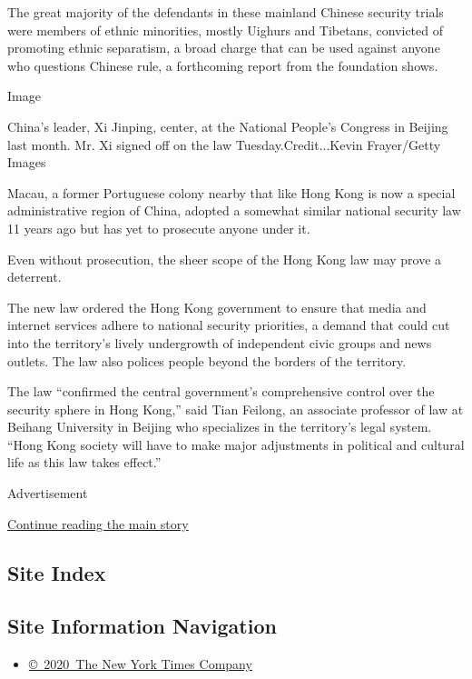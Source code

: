 The great majority of the defendants in these mainland Chinese security
trials were members of ethnic minorities, mostly Uighurs and Tibetans,
convicted of promoting ethnic separatism, a broad charge that can be
used against anyone who questions Chinese rule, a forthcoming report
from the foundation shows.

Image

China's leader, Xi Jinping, center, at the National People's Congress in
Beijing last month. Mr. Xi signed off on the law Tuesday.Credit...Kevin
Frayer/Getty Images

Macau, a former Portuguese colony nearby that like Hong Kong is now a
special administrative region of China, adopted a somewhat similar
national security law 11 years ago but has yet to prosecute anyone under
it.

Even without prosecution, the sheer scope of the Hong Kong law may prove
a deterrent.

The new law ordered the Hong Kong government to ensure that media and
internet services adhere to national security priorities, a demand that
could cut into the territory's lively undergrowth of independent civic
groups and news outlets. The law also polices people beyond the borders
of the territory.

The law ``confirmed the central government's comprehensive control over
the security sphere in Hong Kong,'' said Tian Feilong, an associate
professor of law at Beihang University in Beijing who specializes in the
territory's legal system. ``Hong Kong society will have to make major
adjustments in political and cultural life as this law takes effect.''

Advertisement

\protect\hyperlink{after-bottom}{Continue reading the main story}

\hypertarget{site-index}{%
\subsection{Site Index}\label{site-index}}

\hypertarget{site-information-navigation}{%
\subsection{Site Information
Navigation}\label{site-information-navigation}}

\begin{itemize}
\tightlist
\item
  \href{https://help.nytimes.com/hc/en-us/articles/115014792127-Copyright-notice}{©~2020~The
  New York Times Company}
\end{itemize}

